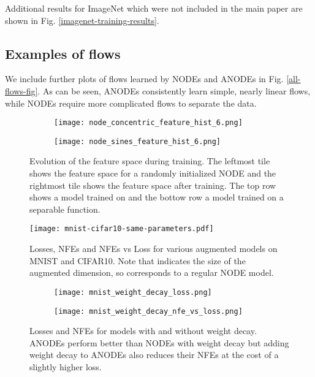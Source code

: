 \documentclass{article}
\begin{document}
Additional results for ImageNet which were not included in the main paper are shown in Fig. \ref{imagenet-training-results}.

\subsection{Examples of flows}

We include further plots of flows learned by NODEs and ANODEs in Fig. \ref{all-flows-fig}. As can be seen, ANODEs consistently learn simple, nearly linear flows, while NODEs require more complicated flows to separate the data.

\begin{figure}[t]
\centering
\begin{subfigure}[t]{0.8\linewidth}
\centering
\texttt{[image: node\_concentric\_feature\_hist\_6.png]}
\end{subfigure}
\begin{subfigure}[t]{0.8\linewidth}
\centering
\texttt{[image: node\_sines\_feature\_hist\_6.png]}
\end{subfigure}
\caption{Evolution of the feature space during training. The leftmost tile shows the feature space for a randomly initialized NODE and the rightmost tile shows the feature space after training. The top row shows a model trained on  and the bottow row a model trained on a separable function.}
\label{feature-space-evolution}
\end{figure}

\begin{figure}[t]
\begin{center}
\texttt{[image: mnist-cifar10-same-parameters.pdf]}
\end{center}
\caption{Losses, NFEs and NFEs vs Loss for various augmented models on MNIST and CIFAR10. Note that  indicates the size of the augmented dimension, so  corresponds to a regular NODE model.}
\label{img-losses-nfes-same-params}
\end{figure}

\begin{figure}[t]
\centering
\begin{subfigure}[t]{0.45\linewidth}
\centering
\texttt{[image: mnist\_weight\_decay\_loss.png]}
\end{subfigure}
\begin{subfigure}[t]{0.45\linewidth}
\centering
\texttt{[image: mnist\_weight\_decay\_nfe\_vs\_loss.png]}
\end{subfigure}
\caption{Losses and NFEs for models with and without weight decay. ANODEs perform better than NODEs with weight decay but adding weight decay to ANODEs also reduces their NFEs at the cost of a slightly higher loss.}
\label{weight-decay-fig}
\end{figure}
\end{document}
